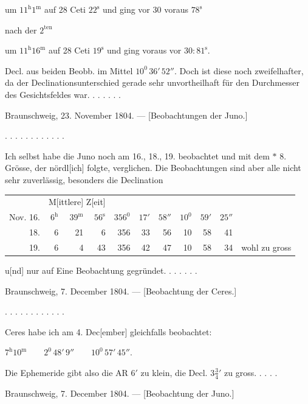 \begin{center}um $11^{\mathrm h}1^{\mathrm m}$ auf 28 Ceti $22^{\mathrm s}$ und ging vor 30 voraus $78^{\mathrm s}$\end{center}
\noindent nach der $2^{\mathrm{ten}}$
\begin{center}um $11^{\mathrm h}16^{\mathrm m}$ auf 28 Ceti $19^{\mathrm s}$ und ging voraus vor $30:81^{\mathrm s}$.\end{center}
\noindent Decl. aus beiden Beobb. im Mittel $10^0\,36'\,52''$. Doch ist diese noch zweifelhafter, da der Declinationsunterschied gerade sehr unvortheilhaft für den Durchmesser des Gesichtsfeldes war. . . . . . .
\begin{center}Braunschweig, 23. November 1804. — [Beobachtungen der Juno.]\end{center}
\noindent . . . . . . . . . . . .\par
\noindent\hspace*{\parindent}Ich selbst habe die Juno noch am 16., 18., 19. beobachtet und mit dem $\ast$ 8. Grösse, der nördl[ich] folgte, verglichen. Die Beobachtungen sind aber alle nicht sehr zuverlässig, besonders die Declination
\begin{center}\small\setlength{\tabcolsep}{4pt}\renewcommand{\arraystretch}{1.15}
\begin{tabular}{r rrr rrr rrr l}
&\multicolumn{3}{c}{M[ittlere] Z[eit]}&&&&&&&\\
Nov. 16.&$6^{\mathrm h}$&$39^{\mathrm m}$&$56^{\mathrm s}$&$356^0$&$17'$&$58''$&$10^0$&$59'$&$25''$&\\
18.&6&21&6&356&33&56&10&58&41&\\
19.&6&4&43&356&42&47&10&58&34&wohl zu gross
\end{tabular}
\end{center}
\noindent u[nd] nur auf Eine Beobachtung gegründet. . . . . . .
\begin{center}Braunschweig, 7. December 1804. — [Beobachtung der Ceres.]\end{center}
\noindent . . . . . . . . . . . .\par
\noindent\hspace*{\parindent}Ceres habe ich am 4. Dec[ember] gleichfalls beobachtet:
\begin{center}$7^{\mathrm h}10^{\mathrm m}\qquad 2^0\,48'\,9''\qquad 10^0\,57'\,45''.$\end{center}
\noindent Die Ephemeride gibt also die AR $6'$ zu klein, die Decl. $3\tfrac34{}'$ zu gross. . . . .
\begin{center}Braunschweig, 7. December 1804. — [Beobachtung der Juno.]\end{center}
